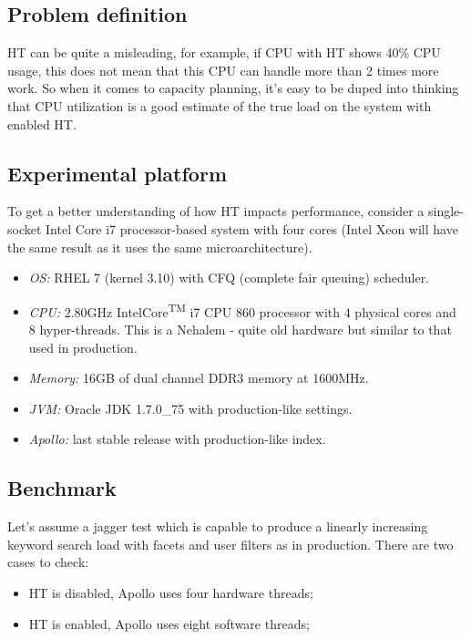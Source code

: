 \documentclass[12pt]{article}
\begin{document}
\subsection{Problem definition}

HT can be quite a misleading, for example, if CPU with HT shows 40\% CPU usage, this does not mean that this CPU can handle more than 2 times more work. So when it comes to capacity planning, it's easy to be duped into thinking that CPU utilization is a good estimate of the true load on the system with enabled HT.

\subsection{Experimental platform}

To get a better understanding of how HT impacts performance, consider a single-socket Intel Core i7 processor-based system with four cores (Intel Xeon will have the same result as it uses the same microarchitecture).

\begin{itemize}
	\item {\em OS:} RHEL 7 (kernel 3.10) with CFQ (complete fair queuing) scheduler. 
	\item {\em CPU:} 2.80GHz Intel\circledR Core\textsuperscript{TM} i7 CPU 860 processor with 4 physical cores and 8 hyper-threads. This is a Nehalem - quite old hardware but similar to that used in production.
	\item {\em Memory:} 16GB of dual channel DDR3 memory at 1600MHz.
	\item {\em JVM:} Oracle JDK 1.7.0\_75 with production-like settings.
	\item {\em Apollo:} last stable release with production-like index.
\end{itemize}

\subsection{Benchmark}

Let's assume a jagger\cite{jagger} test which is capable to produce a linearly increasing keyword search load with facets and user filters as in production. There are two cases to check:
\begin{itemize}
	\item HT is disabled, Apollo uses four hardware threads;
	\item HT is enabled, Apollo uses eight software threads;
\end{itemize} 
\end{document}
